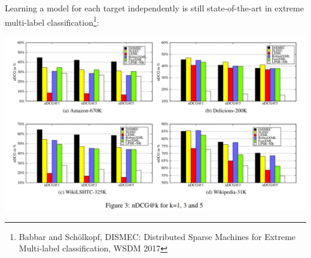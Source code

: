 \documentclass[]{beamer}
\begin{document}
\begin{frame}

\begin{center}
Learning a model for each target independently is still state-of-the-art in extreme multi-label classification\footnote{Babbar and Sch\"olkopf, DISMEC: Distributed Sparse Machines for Extreme Multi-label classification, WSDM 2017}:

\includegraphics[scale=0.3]{Figures/dismec} 
\end{center}

\end{frame}

\end{document}
